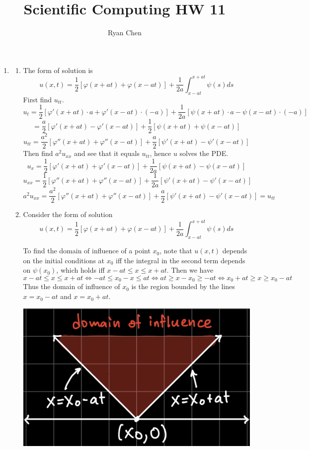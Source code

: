 \documentclass{article}
\title{Scientific Computing HW 11}
\author{Ryan Chen}
\newcommand{\vp}{\varphi}
\begin{document}
	
\maketitle



\begin{enumerate}
	
	
	
\item

\begin{enumerate}
	
	
	\item The form of solution is
	$$u(x,t) = \frac12[\vp(x+at)+\vp(x-at)] + \frac{1}{2a}\int_{x-at}^{x+at}\psi(s)ds$$
	First find $u_{tt}$.
	$$u_t = \frac12[\vp'(x+at)\cdot a+\vp'(x-at)\cdot(-a)] + \frac{1}{2a}[\psi(x+at)\cdot a-\psi(x-at)\cdot(-a)]$$
	$$= \frac{a}{2}[\vp'(x+at)-\vp'(x-at)] + \frac12[\psi(x+at)+\psi(x-at)]$$
	$$u_{tt} = \frac{a^2}{2}[\vp''(x+at)+\vp''(x-at)] + \frac a2[\psi'(x+at)-\psi'(x-at)]$$
	Then find $a^2u_{xx}$ and see that it equals $u_{tt}$, hence $u$ solves the PDE.
	$$u_x = \frac12[\vp'(x+at)+\vp'(x-at)] + \frac{1}{2a}[\psi(x+at)-\psi(x-at)]$$
	$$u_{xx} = \frac12[\vp''(x+at)+\vp''(x-at)] + \frac{1}{2a}[\psi'(x+at)-\psi'(x-at)]$$
	$$a^2u_{xx} = \frac{a^2}{2}[\vp''(x+at)+\vp''(x-at)] + \frac{a}{2}[\psi'(x+at)-\psi'(x-at)] = u_{tt}$$
	
	
	\item Consider the form of solution
	$$u(x,t) = \frac12[\vp(x+at)+\vp(x-at)] + \frac{1}{2a}\int_{x-at}^{x+at}\psi(s)ds$$
	
	To find the domain of influence of a point $x_0$, note that $u(x,t)$ depends on the initial conditions at $x_0$ iff the integral in the second term depends on $\psi(x_0)$, which holds iff $x-at\le x\le x+at$. Then we have
	$$x-at \le x \le x+at
	\iff -at \le x_0-x \le at
	\iff at \ge x-x_0 \ge -at
	\iff x_0+at \ge x \ge x_0-at$$
	Thus the domain of influence of $x_0$ is the region bounded by the lines $x=x_0-at$ and $x=x_0+at$.
	
	\begin{center}
		\includegraphics[scale=.1]{hw11 doi}
	\end{center}
	

\end{enumerate}
\end{enumerate}
\end{document}
